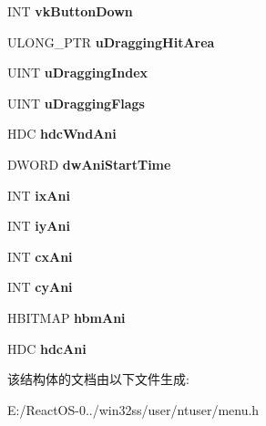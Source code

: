 \begin{DoxyCompactItemize}
I\+NT {\bfseries vk\+Button\+Down}
\item 
\mbox{\label{structtag_m_e_n_u_s_t_a_t_e_a5eddab11b43482c2786cea0caec7ed4c}} 
U\+L\+O\+N\+G\+\_\+\+P\+TR {\bfseries u\+Dragging\+Hit\+Area}
\item 
\mbox{\label{structtag_m_e_n_u_s_t_a_t_e_a4b100e0c2f012ad6503a97caf971574d}} 
U\+I\+NT {\bfseries u\+Dragging\+Index}
\item 
\mbox{\label{structtag_m_e_n_u_s_t_a_t_e_a46201b531b6edde8cd64f351caf834eb}} 
U\+I\+NT {\bfseries u\+Dragging\+Flags}
\item 
\mbox{\label{structtag_m_e_n_u_s_t_a_t_e_a176f88e2c0f8047e3d22dc079679f133}} 
H\+DC {\bfseries hdc\+Wnd\+Ani}
\item 
\mbox{\label{structtag_m_e_n_u_s_t_a_t_e_a46a1403d0b50289356a2d3b7266b1326}} 
D\+W\+O\+RD {\bfseries dw\+Ani\+Start\+Time}
\item 
\mbox{\label{structtag_m_e_n_u_s_t_a_t_e_a52ed0db90dd498b79fb471c46f0eddee}} 
I\+NT {\bfseries ix\+Ani}
\item 
\mbox{\label{structtag_m_e_n_u_s_t_a_t_e_a45863b6c89376aa557ff1f5e2bb5ee4b}} 
I\+NT {\bfseries iy\+Ani}
\item 
\mbox{\label{structtag_m_e_n_u_s_t_a_t_e_aad9aa6b938e37d9e5a15a4aa54cac862}} 
I\+NT {\bfseries cx\+Ani}
\item 
\mbox{\label{structtag_m_e_n_u_s_t_a_t_e_a0a198dfb9913bd5b23df75312c523b5b}} 
I\+NT {\bfseries cy\+Ani}
\item 
\mbox{\label{structtag_m_e_n_u_s_t_a_t_e_aca438090fce45c8d72925a969133f99a}} 
H\+B\+I\+T\+M\+AP {\bfseries hbm\+Ani}
\item 
\mbox{\label{structtag_m_e_n_u_s_t_a_t_e_a09b2fb0049cd2c2885f816128257dbec}} 
H\+DC {\bfseries hdc\+Ani}
\end{DoxyCompactItemize}


该结构体的文档由以下文件生成\+:\begin{DoxyCompactItemize}
\item 
E\+:/\+React\+O\+S-\/0../win32ss/user/ntuser/menu.\+h\end{DoxyCompactItemize}
